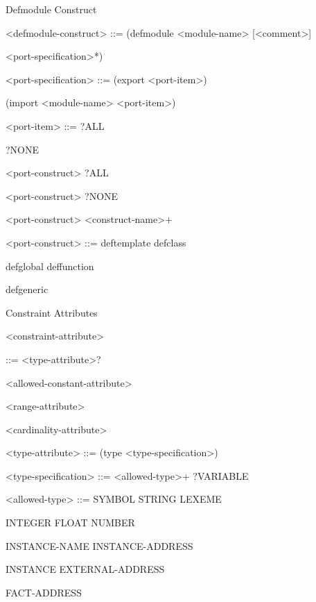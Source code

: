 \documentclass[letterpaper,10pt,english]{sphinxmanual}
\begin{document}
Defmodule Construct

\textless{}defmodule-construct\textgreater{} ::= (defmodule \textless{}module-name\textgreater{} {[}\textless{}comment\textgreater{}{]}

\textless{}port-specification\textgreater{}*)

\textless{}port-specification\textgreater{} ::= (export \textless{}port-item\textgreater{}) \textbar{}

(import \textless{}module-name\textgreater{} \textless{}port-item\textgreater{})

\textless{}port-item\textgreater{} ::= ?ALL \textbar{}

?NONE \textbar{}

\textless{}port-construct\textgreater{} ?ALL \textbar{}

\textless{}port-construct\textgreater{} ?NONE \textbar{}

\textless{}port-construct\textgreater{} \textless{}construct-name\textgreater{}+

\textless{}port-construct\textgreater{} ::= deftemplate \textbar{} defclass \textbar{}

defglobal \textbar{} deffunction \textbar{}

defgeneric

Constraint Attributes

\textless{}constraint-attribute\textgreater{}

::= \textless{}type-attribute\textgreater{}?\textbar{}

\textless{}allowed-constant-attribute\textgreater{} \textbar{}

\textless{}range-attribute\textgreater{} \textbar{}

\textless{}cardinality-attribute\textgreater{}

\textless{}type-attribute\textgreater{} ::= (type \textless{}type-specification\textgreater{})

\textless{}type-specification\textgreater{} ::= \textless{}allowed-type\textgreater{}+ \textbar{} ?VARIABLE

\textless{}allowed-type\textgreater{} ::= SYMBOL \textbar{} STRING \textbar{} LEXEME \textbar{}

INTEGER \textbar{} FLOAT \textbar{} NUMBER \textbar{}

INSTANCE-NAME \textbar{} INSTANCE-ADDRESS \textbar{}

INSTANCE \textbar{} EXTERNAL-ADDRESS \textbar{}

FACT-ADDRESS
\end{document}
